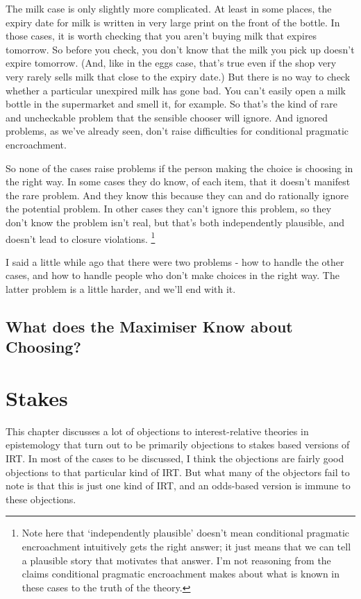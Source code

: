 \documentclass[11pt,]{book}
\let\rmarkdownfootnote\footnote%
\def\footnote{\protect\rmarkdownfootnote}
\begin{document}
The milk case is only slightly more complicated. At least in some places, the expiry date for milk is written in very large print on the front of the bottle. In those cases, it is worth checking that you aren't buying milk that expires tomorrow. So before you check, you don't know that the milk you pick up doesn't expire tomorrow. (And, like in the eggs case, that's true even if the shop very very rarely sells milk that close to the expiry date.) But there is no way to check whether a particular unexpired milk has gone bad. You can't easily open a milk bottle in the supermarket and smell it, for example. So that's the kind of rare and uncheckable problem that the sensible chooser will ignore. And ignored problems, as we've already seen, don't raise difficulties for conditional pragmatic encroachment.

So none of the cases raise problems if the person making the choice is choosing in the right way. In some cases they do know, of each item, that it doesn't manifest the rare problem. And they know this because they can and do rationally ignore the potential problem. In other cases they can't ignore this problem, so they don't know the problem isn't real, but that's both independently plausible, and doesn't lead to closure violations. \footnote{Note here that `independently plausible' doesn't mean conditional pragmatic encroachment intuitively gets the right answer; it just means that we can tell a plausible story that motivates that answer. I'm not reasoning from the claims conditional pragmatic encroachment makes about what is known in these cases to the truth of the theory.}

I said a little while ago that there were two problems - how to handle the other cases, and how to handle people who don't make choices in the right way. The latter problem is a little harder, and we'll end with it.

\hypertarget{what-does-the-maximiser-know-about-choosing}{%
\section{What does the Maximiser Know about Choosing?}\label{what-does-the-maximiser-know-about-choosing}}

\hypertarget{stakes}{%
\chapter{Stakes}\label{stakes}}

This chapter discusses a lot of objections to interest-relative theories in epistemology that turn out to be primarily objections to stakes based versions of IRT. In most of the cases to be discussed, I think the objections are fairly good objections to that particular kind of IRT. But what many of the objectors fail to note is that this is just one kind of IRT, and an odds-based version is immune to these objections.
\end{document}
